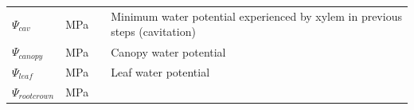 \documentclass[]{book}
\begin{document}
\begin{longtable}[]{@{}llll@{}}
\begin{minipage}[t]{0.11\columnwidth}\raggedright\strut
\(\Psi_{cav}\)\strut
\end{minipage} & \begin{minipage}[t]{0.10\columnwidth}\raggedright\strut
MPa\strut
\end{minipage} & \begin{minipage}[t]{0.12\columnwidth}\raggedright\strut
\strut
\end{minipage} & \begin{minipage}[t]{0.45\columnwidth}\raggedright\strut
Minimum water potential experienced by xylem in previous steps
(cavitation)\strut
\end{minipage}\tabularnewline
\begin{minipage}[t]{0.11\columnwidth}\raggedright\strut
\(\Psi_{canopy}\)\strut
\end{minipage} & \begin{minipage}[t]{0.10\columnwidth}\raggedright\strut
MPa\strut
\end{minipage} & \begin{minipage}[t]{0.12\columnwidth}\raggedright\strut
\strut
\end{minipage} & \begin{minipage}[t]{0.45\columnwidth}\raggedright\strut
Canopy water potential\strut
\end{minipage}\tabularnewline
\begin{minipage}[t]{0.11\columnwidth}\raggedright\strut
\(\Psi_{leaf}\)\strut
\end{minipage} & \begin{minipage}[t]{0.10\columnwidth}\raggedright\strut
MPa\strut
\end{minipage} & \begin{minipage}[t]{0.12\columnwidth}\raggedright\strut
\strut
\end{minipage} & \begin{minipage}[t]{0.45\columnwidth}\raggedright\strut
Leaf water potential\strut
\end{minipage}\tabularnewline
\begin{minipage}[t]{0.11\columnwidth}\raggedright\strut
\(\Psi_{rootcrown}\)\strut
\end{minipage} & \begin{minipage}[t]{0.10\columnwidth}\raggedright\strut
MPa\strut
\end{minipage} & \begin{minipage}[t]{0.12\columnwidth}\raggedright\strut
\strut
\end{minipage} & \begin{minipage}[t]{0.45\columnwidth}\raggedright\strut

\end{minipage}
\end{longtable}
\end{document}
